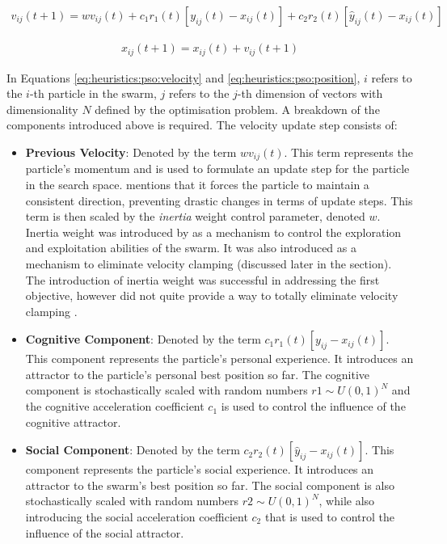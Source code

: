 \begin{equation}
    \label{eq:heuristics:pso:velocity}
    \begin{split}
        v_{ij}(t+1) = wv_{ij}(t) + c_{1}r_{1}(t)[y_{ij}(t) - x_{ij}(t)] + c_{2}r_{2}(t)[\hat{y}_{ij}(t) - x_{ij}(t)]
    \end{split}
\end{equation}

\begin{equation}
    \label{eq:heuristics:pso:position}
    \begin{split}
        x_{ij}(t+1) = x_{ij}(t) + v_{ij}(t+1)
    \end{split}
\end{equation}

In Equations \ref{eq:heuristics:pso:velocity} and \ref{eq:heuristics:pso:position}, $i$ refers to the $i$-th particle in the swarm, $j$ refers to the $j$-th dimension of vectors with dimensionality $N$ defined by the optimisation problem. A breakdown of the components introduced above is required. The velocity update step consists of:

\begin{itemize}
    \item \textbf{Previous Velocity}: Denoted by the term $wv_{ij}(t)$. This term represents the particle's momentum and is used to formulate an update step for the particle in the search space. \citeauthor{ref:vanwyk:2014}\cite{ref:vanwyk:2014} mentions that it forces the particle to maintain a consistent direction, preventing drastic changes in terms of update steps. This term is then scaled by the \textit{inertia} weight control parameter, denoted $w$. Inertia weight was introduced by \citeauthor{ref:shi:1998}\cite{ref:shi:1998} as a mechanism to control the exploration and exploitation abilities of the swarm. It was also introduced as a mechanism to eliminate velocity clamping (discussed later in the section). The introduction of inertia weight was successful in addressing the first objective, however did not quite provide a way to totally eliminate velocity clamping \cite{ref:shi:2001}. 
    
    \item \textbf{Cognitive Component}: Denoted by the term $c_{1}r_{1}(t)[y_{ij} - x_{ij}(t)]$. This component represents the particle's personal  experience. It introduces an attractor to the particle's personal best position so far. The cognitive component is stochastically scaled with random numbers $r{1} \sim U(0,1)^N$ and the cognitive acceleration coefficient $c_{1}$ is used to control the influence of the cognitive attractor.
    
    \item \textbf{Social Component}: Denoted by the term $c_{2}r_{2}(t)[\hat{y}_{ij} - x_{ij}(t)]$. This component represents the particle's social  experience. It introduces an attractor to the swarm's best position so far. The social component is also stochastically scaled with random numbers $r{2} \sim U(0,1)^N$, while also introducing the social acceleration coefficient $c_{2}$ that is used to control the influence of the social attractor.
\end{itemize}

